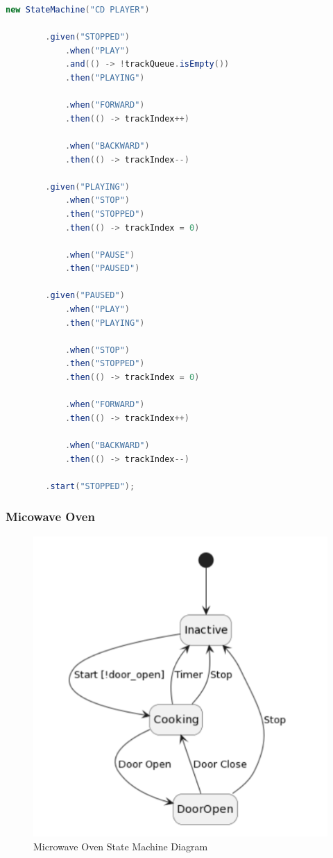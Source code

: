 \documentclass{article}
\begin{document}
\begin{lstlisting}[language=java, caption={CD Player Implmentation}, captionpos=b]
    new StateMachine("CD PLAYER")

        .given("STOPPED")
            .when("PLAY")
            .and(() -> !trackQueue.isEmpty())
            .then("PLAYING")

            .when("FORWARD")
            .then(() -> trackIndex++)

            .when("BACKWARD")
            .then(() -> trackIndex--)

        .given("PLAYING")
            .when("STOP")
            .then("STOPPED")
            .then(() -> trackIndex = 0)

            .when("PAUSE")
            .then("PAUSED")

        .given("PAUSED")
            .when("PLAY")
            .then("PLAYING")

            .when("STOP")
            .then("STOPPED")
            .then(() -> trackIndex = 0)

            .when("FORWARD")
            .then(() -> trackIndex++)

            .when("BACKWARD")
            .then(() -> trackIndex--)
            
        .start("STOPPED");
\end{lstlisting}

\subsubsection{Micowave Oven}

\begin{figure}[H]
    \centering
    \includegraphics[scale=.75]{./figures/oven.PNG}
    \caption{Microwave Oven State Machine Diagram}
\end{figure}
\end{document}
